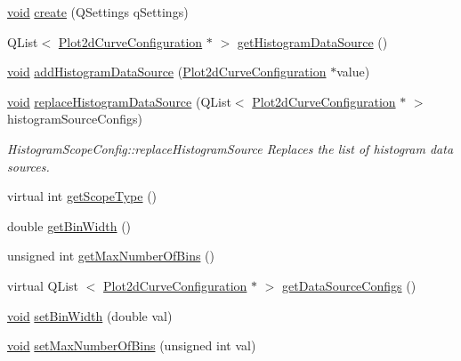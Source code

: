 \begin{DoxyCompactItemize}
\hyperlink{group___u_a_v_objects_plugin_ga444cf2ff3f0ecbe028adce838d373f5c}{void} \hyperlink{group___scope_plugin_ga23b4c258bf17b6bc16c3dc75ea7d98eb}{create} (\-Q\-Settings q\-Settings)
\item 
\-Q\-List$<$ \hyperlink{struct_plot2d_curve_configuration}{\-Plot2d\-Curve\-Configuration} $\ast$ $>$ \hyperlink{group___scope_plugin_gac01f208b6d79e28b2f148abc13d6b0b9}{get\-Histogram\-Data\-Source} ()
\item 
\hyperlink{group___u_a_v_objects_plugin_ga444cf2ff3f0ecbe028adce838d373f5c}{void} \hyperlink{group___scope_plugin_ga2092a20c3f43c9eb68d370e7dc98cd2b}{add\-Histogram\-Data\-Source} (\hyperlink{struct_plot2d_curve_configuration}{\-Plot2d\-Curve\-Configuration} $\ast$value)
\item 
\hyperlink{group___u_a_v_objects_plugin_ga444cf2ff3f0ecbe028adce838d373f5c}{void} \hyperlink{group___scope_plugin_gaa036bf883eaa724bb577ee9de902dce1}{replace\-Histogram\-Data\-Source} (\-Q\-List$<$ \hyperlink{struct_plot2d_curve_configuration}{\-Plot2d\-Curve\-Configuration} $\ast$ $>$ histogram\-Source\-Configs)
\begin{DoxyCompactList}\small\item\em \-Histogram\-Scope\-Config\-::replace\-Histogram\-Source \-Replaces the list of histogram data sources. \end{DoxyCompactList}\item 
virtual int \hyperlink{group___scope_plugin_ga232680e8671b7a4e205a11f5f164aa1a}{get\-Scope\-Type} ()
\item 
double \hyperlink{group___scope_plugin_gac7c220940b1b3c4c51997623b0268f3d}{get\-Bin\-Width} ()
\item 
unsigned int \hyperlink{group___scope_plugin_ga4b72da75ea27852393740b47bf6f6ae5}{get\-Max\-Number\-Of\-Bins} ()
\item 
virtual \-Q\-List\*
$<$ \hyperlink{struct_plot2d_curve_configuration}{\-Plot2d\-Curve\-Configuration} $\ast$ $>$ \hyperlink{group___scope_plugin_ga79e96fd6c2de93da275c9d1b3c568e95}{get\-Data\-Source\-Configs} ()
\item 
\hyperlink{group___u_a_v_objects_plugin_ga444cf2ff3f0ecbe028adce838d373f5c}{void} \hyperlink{group___scope_plugin_ga692ce41b341567916c0ff62a541b4138}{set\-Bin\-Width} (double val)
\item 
\hyperlink{group___u_a_v_objects_plugin_ga444cf2ff3f0ecbe028adce838d373f5c}{void} \hyperlink{group___scope_plugin_ga9fc3929f75679aa143e96e9919de54ac}{set\-Max\-Number\-Of\-Bins} (unsigned int val)
\item 

\end{DoxyCompactItemize}
